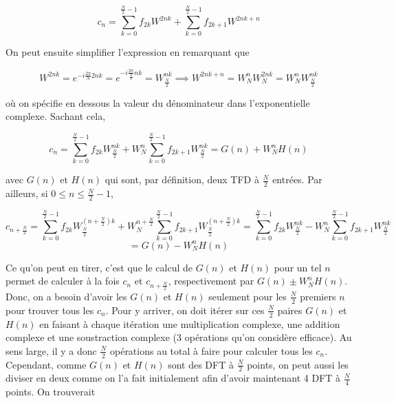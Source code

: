 \begin{equation*}
    c_n = \sum_{k=0}^{\frac{N}{2}-1}f_{2k}W^{2nk} + \sum_{k=0}^{\frac{N}{2}-1}f_{2k + 1}W^{2nk + n} 
\end{equation*}

On peut ensuite simplifier l'expression en remarquant que 

\begin{equation*}
    W^{2nk} = e^{-i\frac{2\pi}{N}2nk} = e^{-i\frac{2\pi}{\frac{N}{2}}nk} = W^{nk}_{\frac{N}{2}} \implies W^{2nk+n} = W^n_N W^{2nk}_N = W^n_N W^{nk}_{\frac{N}{2}}
\end{equation*}

où on spécifie en dessous la valeur du dénominateur dans l'exponentielle complexe. Sachant cela,

\begin{equation*}
    c_n = \sum_{k=0}^{\frac{N}{2}-1}f_{2k}W^{nk}_{\frac{N}{2}} + W^n_N\sum_{k=0}^{\frac{N}{2}-1}f_{2k + 1}W^{nk}_{\frac{N}{2}} = G(n) + W^n_N H(n)
\end{equation*}

avec $G(n)$ et $H(n)$ qui sont, par définition, deux TFD à $\frac{N}{2}$ entrées. Par ailleurs, si $0 \leq n \leq \frac{N}{2} - 1$,

\begin{equation*}
    c_{n+\frac{N}{2}} = \sum_{k=0}^{\frac{N}{2}-1}f_{2k}W^{(n + \frac{N}{2})k}_{\frac{N}{2}} + W^{n + \frac{N}{2}}_N\sum_{k=0}^{\frac{N}{2}-1}f_{2k + 1}W^{(n+\frac{N}{2})k}_{\frac{N}{2}} = \sum_{k=0}^{\frac{N}{2}-1}f_{2k}W^{nk}_{\frac{N}{2}} - W^n_N\sum_{k=0}^{\frac{N}{2}-1}f_{2k + 1}W^{nk}_{\frac{N}{2}}
\end{equation*}
\begin{equation*}
    = G(n) - W^n_N H(n)
\end{equation*}

Ce qu'on peut en tirer, c'est que le calcul de $G(n)$ et $H(n)$ pour un tel $n$ permet de calculer à la fois $c_n$ et $c_{n+\frac{N}{2}}$, respectivement par $G(n) \pm W^n_N H(n)$. Donc, on a besoin d'avoir les $G(n)$ et $H(n)$ seulement pour les $\frac{N}{2}$ premiers $n$ pour trouver tous les $c_n$. Pour y arriver, on doit itérer sur ces $\frac{N}{2}$ paires $G(n)$ et $H(n)$ en faisant à chaque itération une multiplication complexe, une addition complexe et une soustraction complexe (3 opérations qu'on considère efficace). Au sens large, il y a donc $\frac{N}{2}$ opérations au total à faire pour calculer tous les $c_n$. Cependant, comme $G(n)$ et $H(n)$ sont des DFT à $\frac{N}{2}$ points, on peut aussi les diviser en deux comme on l'a fait initialement afin d'avoir maintenant 4 DFT à $\frac{N}{4}$ points. On trouverait 

